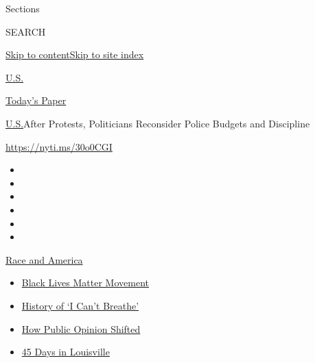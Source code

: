 Sections

SEARCH

\protect\hyperlink{site-content}{Skip to
content}\protect\hyperlink{site-index}{Skip to site index}

\href{https://www.nytimes3xbfgragh.onion/section/us}{U.S.}

\href{https://myaccount.nytimes3xbfgragh.onion/auth/login?response_type=cookie\&client_id=vi}{}

\href{https://www.nytimes3xbfgragh.onion/section/todayspaper}{Today's
Paper}

\href{/section/us}{U.S.}\textbar{}After Protests, Politicians Reconsider
Police Budgets and Discipline

\url{https://nyti.ms/30o0CGI}

\begin{itemize}
\item
\item
\item
\item
\item
\item
\end{itemize}

\href{https://www.nytimes3xbfgragh.onion/news-event/george-floyd-protests-minneapolis-new-york-los-angeles?action=click\&pgtype=Article\&state=default\&region=TOP_BANNER\&context=storylines_menu}{Race
and America}

\begin{itemize}
\tightlist
\item
  \href{https://www.nytimes3xbfgragh.onion/interactive/2020/07/03/us/george-floyd-protests-crowd-size.html?action=click\&pgtype=Article\&state=default\&region=TOP_BANNER\&context=storylines_menu}{Black
  Lives Matter Movement}
\item
  \href{https://www.nytimes3xbfgragh.onion/interactive/2020/06/28/us/i-cant-breathe-police-arrest.html?action=click\&pgtype=Article\&state=default\&region=TOP_BANNER\&context=storylines_menu}{History
  of `I Can't Breathe'}
\item
  \href{https://www.nytimes3xbfgragh.onion/interactive/2020/06/10/upshot/black-lives-matter-attitudes.html?action=click\&pgtype=Article\&state=default\&region=TOP_BANNER\&context=storylines_menu}{How
  Public Opinion Shifted}
\item
  \href{https://www.nytimes3xbfgragh.onion/interactive/2020/07/16/us/black-lives-matter-protests-louisville-breonna-taylor.html?action=click\&pgtype=Article\&state=default\&region=TOP_BANNER\&context=storylines_menu}{45
  Days in Louisville}
\end{itemize}

